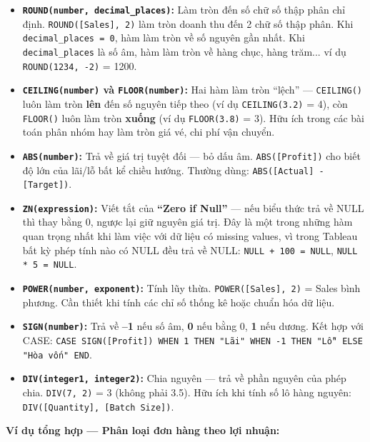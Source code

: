 \documentclass[12pt]{article}
\begin{document}
\begin{itemize}
    \item \textbf{\texttt{ROUND(number, decimal\_places)}:} Làm tròn đến số chữ số thập phân chỉ định. \texttt{ROUND([Sales], 2)} làm tròn doanh thu đến 2 chữ số thập phân. Khi \texttt{decimal\_places = 0}, hàm làm tròn về số nguyên gần nhất. Khi \texttt{decimal\_places} là số âm, hàm làm tròn về hàng chục, hàng trăm... ví dụ \texttt{ROUND(1234, -2)} = 1200.

    \item \textbf{\texttt{CEILING(number)} và \texttt{FLOOR(number)}:} Hai hàm làm tròn ``lệch'' --- \texttt{CEILING()} luôn làm tròn \textbf{lên} đến số nguyên tiếp theo (ví dụ \texttt{CEILING(3.2)} = 4), còn \texttt{FLOOR()} luôn làm tròn \textbf{xuống} (ví dụ \texttt{FLOOR(3.8)} = 3). Hữu ích trong các bài toán phân nhóm hay làm tròn giá vé, chi phí vận chuyển.

    \item \textbf{\texttt{ABS(number)}:} Trả về giá trị tuyệt đối --- bỏ dấu âm. \texttt{ABS([Profit])} cho biết độ lớn của lãi/lỗ bất kể chiều hướng. Thường dùng: \texttt{ABS([Actual] - [Target])}.

    \item \textbf{\texttt{ZN(expression)}:} Viết tắt của \textbf{``Zero if Null''} --- nếu biểu thức trả về NULL thì thay bằng 0, ngược lại giữ nguyên giá trị. Đây là một trong những hàm quan trọng nhất khi làm việc với dữ liệu có missing values, vì trong Tableau bất kỳ phép tính nào có NULL đều trả về NULL: \texttt{NULL + 100 = NULL}, \texttt{NULL * 5 = NULL}.

    \item \textbf{\texttt{POWER(number, exponent)}:} Tính lũy thừa. \texttt{POWER([Sales], 2)} = Sales bình phương. Cần thiết khi tính các chỉ số thống kê hoặc chuẩn hóa dữ liệu.

    \item \textbf{\texttt{SIGN(number)}:} Trả về \textbf{--1} nếu số âm, \textbf{0} nếu bằng 0, \textbf{1} nếu dương. Kết hợp với CASE: \texttt{CASE SIGN([Profit]) WHEN 1 THEN "Lãi" WHEN -1 THEN "Lỗ" ELSE "Hòa vốn" END}.

    \item \textbf{\texttt{DIV(integer1, integer2)}:} Chia nguyên --- trả về phần nguyên của phép chia. \texttt{DIV(7, 2)} = 3 (không phải 3.5). Hữu ích khi tính số lô hàng nguyên: \texttt{DIV([Quantity], [Batch Size])}.
\end{itemize}

\noindent \textbf{Ví dụ tổng hợp --- Phân loại đơn hàng theo lợi nhuận:}
\end{document}
